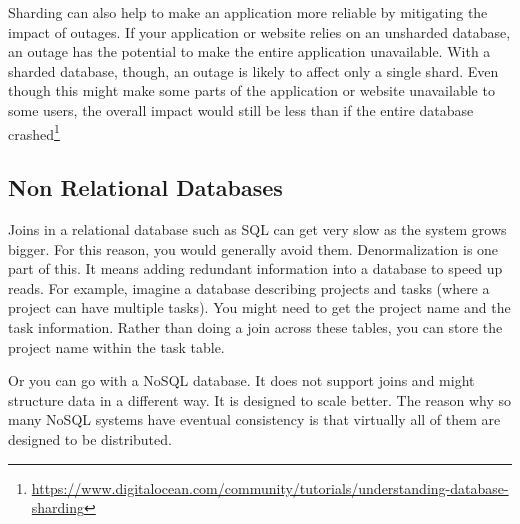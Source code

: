 \documentclass[a4paper, 11.25pt]{article}
\begin{document}
Sharding can also help to make an application more reliable by mitigating the impact of outages. If your application or website relies on an unsharded database, an outage has the potential to make the entire application unavailable. With a sharded database, though, an outage is likely to affect only a single shard. Even though this might make some parts of the application or website unavailable to some users, the overall impact would still be less than if the entire database crashed\footnote{\url{https://www.digitalocean.com/community/tutorials/understanding-database-sharding}}

\subsection{Non Relational Databases}
Joins in a relational database such as SQL can get very slow as the system grows bigger. For this reason, you would generally avoid them. Denormalization is one part of this. It means adding redundant information into a database to speed up reads. For example, imagine a database describing projects and tasks (where a project can have multiple tasks). You might need to get the project name and the task information. Rather than doing a join across these tables, you can store the project name within the task table. 

Or you can go with a NoSQL database. It does not support joins and might structure data in a different way. It is designed to scale better. The reason why so many NoSQL systems have eventual consistency is that virtually all of them are designed to be distributed.



\end{document}
